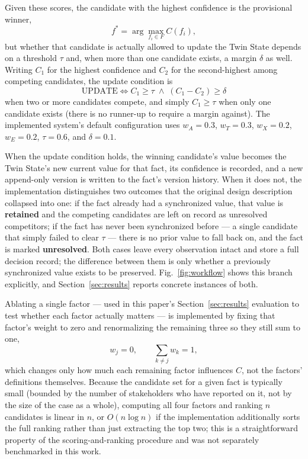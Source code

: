 \documentclass[conference]{IEEEtran}
\begin{document}
Given these scores, the candidate with the highest confidence is the
provisional winner,
\begin{equation}
f^{*} = \arg\max_{f_i \in F} C(f_i),
\label{eq:argmax}
\end{equation}
but whether that candidate is actually allowed to update the Twin State
depends on a threshold $\tau$ and, when more than one candidate exists, a
margin $\delta$ as well. Writing $C_1$ for the highest confidence and $C_2$
for the second-highest among competing candidates, the update condition is
\begin{equation}
\text{UPDATE} \iff C_1 \ge \tau \;\wedge\; (C_1 - C_2) \ge \delta
\label{eq:decision}
\end{equation}
when two or more candidates compete, and simply $C_1 \ge \tau$ when only
one candidate exists (there is no runner-up to require a margin against).
The implemented system's default configuration uses $w_A = 0.3$, $w_T =
0.3$, $w_X = 0.2$, $w_E = 0.2$, $\tau = 0.6$, and $\delta = 0.1$.

When the update condition holds, the winning candidate's value becomes the
Twin State's new current value for that fact, its confidence is recorded,
and a new append-only version is written to the fact's version history.
When it does not, the implementation distinguishes two outcomes that the
original design description collapsed into one: if the fact already had a
synchronized value, that value is \textbf{retained} and the competing
candidates are left on record as unresolved competitors; if the fact has
never been synchronized before --- a single candidate that simply failed to
clear $\tau$ --- there is no prior value to fall back on, and the fact is
marked \textbf{unresolved}. Both cases leave every observation intact and
store a full decision record; the difference between them is only whether a
previously synchronized value exists to be preserved.
Fig.~\ref{fig:workflow} shows this branch explicitly, and
Section~\ref{sec:results} reports concrete instances of both.

Ablating a single factor --- used in this paper's
Section~\ref{sec:results} evaluation to test whether each factor actually
matters --- is implemented by fixing that factor's weight to zero and
renormalizing the remaining three so they still sum to one,
\begin{equation}
w_j = 0, \qquad \sum_{k \ne j} w_k = 1,
\label{eq:ablation}
\end{equation}
which changes only how much each remaining factor influences $C$, not the
factors' definitions themselves. Because the candidate set for a given fact
is typically small (bounded by the number of stakeholders who have reported
on it, not by the size of the case as a whole), computing all four factors
and ranking $n$ candidates is linear in $n$, or $O(n \log n)$ if the
implementation additionally sorts the full ranking rather than just
extracting the top two; this is a straightforward property of the
scoring-and-ranking procedure and was not separately benchmarked in this
work.
\end{document}
